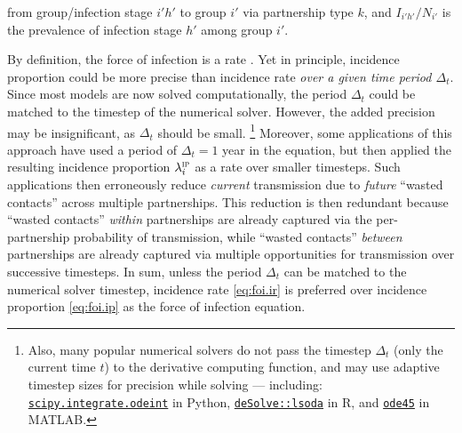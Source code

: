 from group/infection stage $i'h'$ to group $i'$ via partnership type $k$,
and $I_{i'h'}/N_{i'}$ is the prevalence of infection stage $h'$ among group $i'$.
\par
By definition, the force of infection is a rate \cite{Anderson1991}.
Yet in principle, incidence proportion could be more precise than incidence rate
\emph{over a given time period $\Delta_t$}.
Since most models are now solved computationally,
the period $\Delta_t$ could be matched to the timestep of the numerical solver.
However, the added precision may be insignificant, as $\Delta_t$ should be small.%
\footnote{Also, many popular numerical solvers do not pass the timestep $\Delta_t$
  (only the current time $t$) to the derivative computing function,
  and may use adaptive timestep sizes for precision while solving --- including:
  \href{https://docs.scipy.org/doc/scipy/reference/generated/scipy.integrate.odeint.html}
  {\texttt{scipy.integrate.odeint}} in Python,
  \href{https://cran.r-project.org/web/packages/deSolve/index.html}
  {\texttt{deSolve::lsoda}} in R, and
  \href{https://www.mathworks.com/help/matlab/ref/ode45.html}
  {\texttt{ode45}} in MATLAB.}
Moreover, some applications of this approach have used
a period of $\Delta_t = 1$ year in the equation, but then
applied the resulting incidence proportion $\lambda_i^\textsc{ip}$ as a rate over smaller timesteps.
Such applications then erroneously reduce \emph{current} transmission
due to \emph{future} ``wasted contacts'' across multiple partnerships.
This reduction is then redundant because
``wasted contacts'' \emph{within} partnerships are already captured via
the per-partnership probability of transmission, while
``wasted contacts'' \emph{between} partnerships are already captured via
multiple opportunities for transmission over successive timesteps.
In sum, unless the period $\Delta_t$ can be matched to the numerical solver timestep,
incidence rate \eqref{eq:foi.ir} is preferred over incidence proportion \eqref{eq:foi.ip}
as the force of infection equation.
